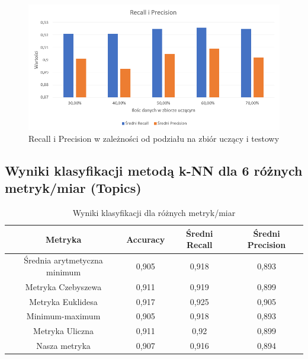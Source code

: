 \documentclass{classrep}
\begin{document}
{\begin{figure}[H]
\caption{Recall i Precision w zależności od podziału na zbiór uczący i testowy}
\centering
\includegraphics[width=1\textwidth]{i12}
\end{figure}

\subsection{Wyniki klasyfikacji metodą k-NN dla 6 różnych metryk/miar (Topics)}

\begin{table}[h]
\begin{center}
\caption{Wyniki klasyfikacji dla różnych metryk/miar}
\begin{tabular}{|c|c|c|c|}
\hline
\textbf{Metryka}             & \textbf{Accuracy} & \textbf{Średni Recall} & \textbf{Średni Precision} \\ \hline
Średnia arytmetyczna minimum & 0,905             & 0,918                  & 0,893                     \\ \hline
Metryka Czebyszewa           & 0,911             & 0,919                  & 0,899                     \\ \hline
Metryka Euklidesa            & 0,917             & 0,925                  & 0,905                     \\ \hline
Minimum-maximum              & 0,905             & 0,918                  & 0,893                     \\ \hline
Metryka Uliczna              & 0,911             & 0,92                   & 0,899                     \\ \hline
Nasza metryka                & 0,907             & 0,916                  & 0,894                     \\ \hline
\end{tabular}
\end{center}
\end{table}

}
\end{document}
